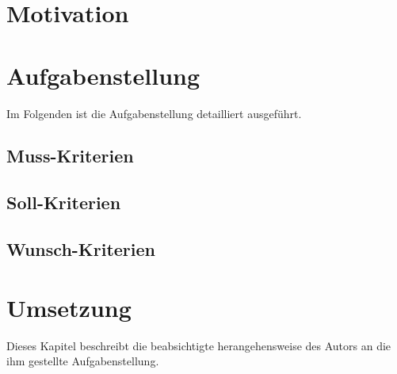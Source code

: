 \documentclass[a4paper,16pt,fleqn,titlepage]{article}
\title{}
\author{Christoph M. Gnip}
\date{04/10/13}
\begin{document}
\maketitle

\begin{abstract}


\end{abstract}

\tableofcontents
\newpage

\section{Motivation}


\section{Aufgabenstellung}
Im Folgenden ist die Aufgabenstellung detailliert ausgeführt.
\subsection{Muss-Kriterien}
\subsection{Soll-Kriterien}
\subsection{Wunsch-Kriterien}

\section{Umsetzung}
Dieses Kapitel beschreibt die beabsichtigte herangehensweise des Autors an die
ihm gestellte Aufgabenstellung.
\subsection{}

\end{document}
